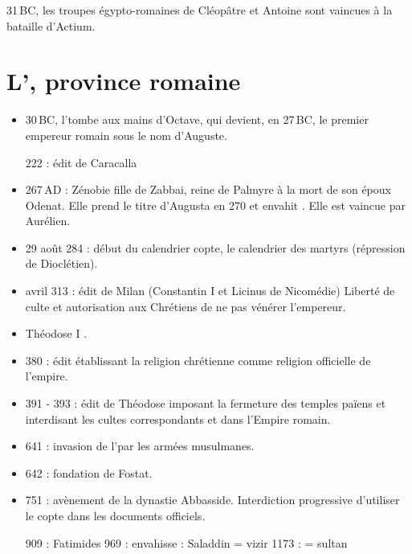 31\,BC, les troupes égypto-romaines de Cléopâtre et Antoine sont 
vaincues à la bataille d'Actium.

\section{L'\kmt, province romaine}

\begin{itemize}\setlength\itemsep{0.8\baselineskip}
  \item 30\,BC, l'\kmt tombe aux mains d'Octave, qui devient, 
        en 27\,BC, le premier empereur romain sous le nom d'Auguste.

222 : édit de Caracalla

  \item 267\,AD : Zénobie fille de Zabbai, reine de Palmyre à la mort 
        de son époux Odenat. Elle prend le titre d'Augusta en 270 et 
        envahit \kmt. Elle est vaincue par Aurélien.
  \item 29 août 284 : début du calendrier copte, le \og calendrier 
        des martyrs \fg (répression de Dioclétien).
  \item avril 313 : édit de Milan (Constantin I\ier{} 
         et Licinus de Nicomédie) Liberté de culte 
        et autorisation aux Chrétiens de ne pas vénérer l'empereur.
  \item Théodose I\ier{} .
  \item 380 : édit établissant la religion chrétienne comme 
        religion officielle de l'empire.
  \item 391 - 393 : édit de Théodose imposant la fermeture des temples 
        païens et interdisant les cultes correspondants et dans 
        l'Empire romain.
  \item 641 : invasion de l'\kmt par les armées musulmanes.
  \item 642 : fondation de Fostat.
  \item 751 : avènement de la dynastie Abbasside. Interdiction 
        progressive d'utiliser le copte dans les documents officiels.

        909 : Fatimides
        969 : envahisse  : Saladdin = vizir
        1173 :          = sultan
        
\end{itemize}

